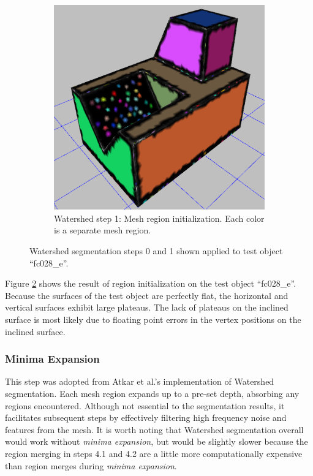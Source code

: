 \begin{figure}[htb]
\begin{subfigure}{0.45\textwidth}
		\includegraphics[width=\linewidth]{../resources/watershed/fc028_WS1.png}
		\caption{Watershed step 1: Mesh region initialization. Each color is a separate mesh region.}
		\label{sfig:ws_1}
	\end{subfigure}
\caption{
Watershed segmentation steps 0 and 1 shown applied to test object ``fc028\_e''.
}
\end{figure}

Figure \ref{sfig:ws_1} shows the result of region initialization on the test object ``fc028\_e''.
Because the surfaces of the test object are perfectly flat, the horizontal and vertical surfaces exhibit large plateaus.
The lack of plateaus on the inclined surface is most likely due to floating point errors in the vertex positions on the inclined surface.

\subsubsection{Minima Expansion}
This step was adopted from Atkar et al.'s implementation of Watershed segmentation\cite{HierSurfSeg_for_autobody_painting}.
Each mesh region expands up to a pre-set depth, absorbing any regions encountered.
Although not essential to the segmentation results, it facilitates subsequent steps by effectively filtering high frequency noise and features from the mesh.
It is worth noting that Watershed segmentation overall would work without \textit{minima expansion}, but would be slightly slower because the region merging in steps 4.1 and 4.2 are a little more computationally expensive than region merges during \textit{minima expansion}.

